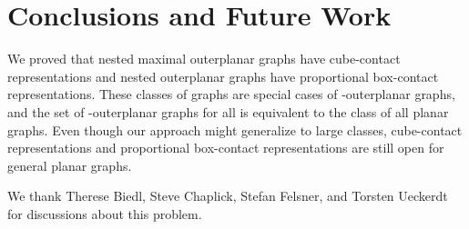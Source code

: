 \documentclass{llncs}
\begin{document}
\section{Conclusions and Future Work}

 
We proved that nested maximal outerplanar graphs have cube-contact
 representations and nested outerplanar graphs have proportional box-contact representations.
 These classes of graphs are special cases of -outerplanar graphs, and the set of
 -outerplanar graphs for all  is equivalent to the class of all planar graphs. 
Even though our approach might generalize to large classes, 
cube-contact representations and proportional box-contact representations are still open for general planar graphs.




\medskip
{} We thank 
 Therese Biedl, Steve Chaplick, Stefan Felsner, and Torsten Ueckerdt for discussions about this problem.
\end{document}

